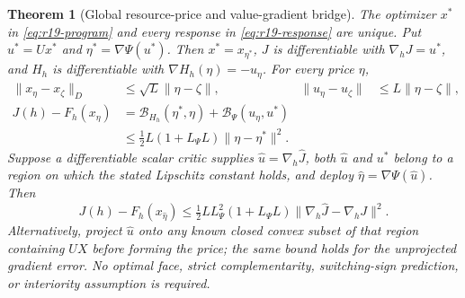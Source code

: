 \documentclass[11pt,letterpaper]{article}
\newtheorem{theorem}{Theorem}[section]
\theoremstyle{definition}
\newcommand{\1}{\mathbf 1}
\begin{document}
\begin{theorem}[Global resource-price and value-gradient bridge]\label{thm:r19-global}
The optimizer $x^*$ in \eqref{eq:r19-program} and every response in \eqref{eq:r19-response} are unique. Put $u^*=Ux^*$ and $\eta^*=\nabla\Psi(u^*)$. Then $x^*=x_{\eta^*}$, $J$ is differentiable with $\nabla_hJ=u^*$, and $H_h$ is differentiable with $\nabla H_h(\eta)=-u_\eta$. For every price $\eta$,
\begin{align}
 \|x_\eta-x_\zeta\|_D&\leq\sqrt L\|\eta-\zeta\|,
 &\|u_\eta-u_\zeta\|&\leq L\|\eta-\zeta\|,\label{eq:r19-lipschitz}\\
 J(h)-F_h(x_\eta)
 &=\mathcal B_{H_h}(\eta^*,\eta)+\mathcal B_\Psi(u_\eta,u^*)\label{eq:r19-identity}\\
 &\leq\tfrac12L(1+L_\Psi L)\|\eta-\eta^*\|^2.\label{eq:r19-pricebound}
\end{align}
Suppose a differentiable scalar critic supplies $\widehat u=\nabla_h\widehat J$, both $\widehat u$ and $u^*$ belong to a region on which the stated Lipschitz constant holds, and deploy $\widehat\eta=\nabla\Psi(\widehat u)$. Then
\begin{equation}\label{eq:r19-gradientbound}
 J(h)-F_h(x_{\widehat\eta})
 \leq\tfrac12L L_\Psi^2(1+L_\Psi L)
              \|\nabla_h\widehat J-\nabla_hJ\|^2.
\end{equation}
Alternatively, project $\widehat u$ onto any known closed convex subset of that region containing $UX$ before forming the price; the same bound holds for the unprojected gradient error. No optimal face, strict complementarity, switching-sign prediction, or interiority assumption is required.
\end{theorem}
\end{document}
